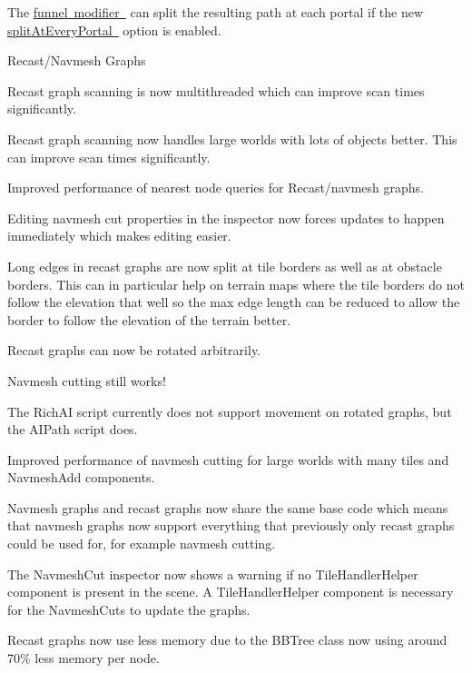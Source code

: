 \begin{DoxyItemize}
\begin{DoxyItemize}
\begin{DoxyItemize}
\begin{DoxyItemize}
\item The \mbox{\hyperlink{class_pathfinding_1_1_funnel_modifier}{funnel modifier }} can split the resulting path at each portal if the new \mbox{\hyperlink{class_pathfinding_1_1_funnel_modifier_af7836aecb7f32833f46856b0b5d9752b}{split\+At\+Every\+Portal }} option is enabled.
\end{DoxyItemize}
\item Recast/\+Navmesh Graphs
\begin{DoxyItemize}
\item Recast graph scanning is now multithreaded which can improve scan times significantly.
\item Recast graph scanning now handles large worlds with lots of objects better. This can improve scan times significantly. 
\item Improved performance of nearest node queries for Recast/navmesh graphs.
\item Editing navmesh cut properties in the inspector now forces updates to happen immediately which makes editing easier.
\item Long edges in recast graphs are now split at tile borders as well as at obstacle borders. This can in particular help on terrain maps where the tile borders do not follow the elevation that well so the max edge length can be reduced to allow the border to follow the elevation of the terrain better.
\item Recast graphs can now be rotated arbitrarily.
\begin{DoxyItemize}
\item Navmesh cutting still works!
\item The Rich\+AI script currently does not support movement on rotated graphs, but the A\+I\+Path script does.
\end{DoxyItemize}
\item Improved performance of navmesh cutting for large worlds with many tiles and Navmesh\+Add components.
\item Navmesh graphs and recast graphs now share the same base code which means that navmesh graphs now support everything that previously only recast graphs could be used for, for example navmesh cutting.
\item The Navmesh\+Cut inspector now shows a warning if no Tile\+Handler\+Helper component is present in the scene. A Tile\+Handler\+Helper component is necessary for the Navmesh\+Cuts to update the graphs.
\item Recast graphs now use less memory due to the B\+B\+Tree class now using around 70\% less memory per node.

\end{DoxyItemize}
\end{DoxyItemize}
\end{DoxyItemize}
\end{DoxyItemize}
